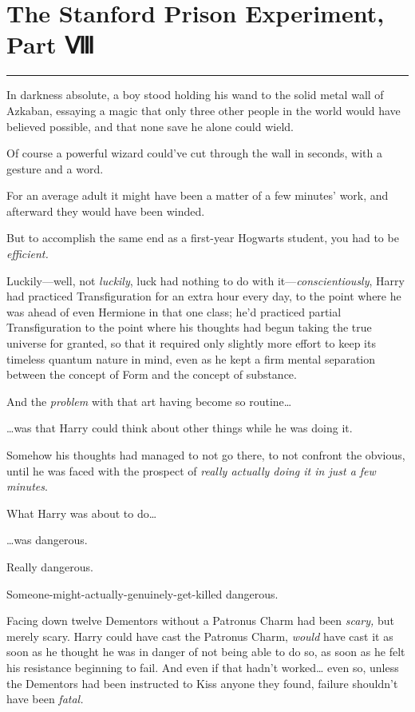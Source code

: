 \chapter{The Stanford Prison Experiment, Part
Ⅷ}\label{the-stanford-prison-experiment-part}

\begin{center}\rule{3in}{0.4pt}\end{center}

In darkness absolute, a boy stood holding his wand to the solid metal
wall of Azkaban, essaying a magic that only three other people in the
world would have believed possible, and that none save he alone could
wield.

Of course a powerful wizard could've cut through the wall in seconds,
with a gesture and a word.

For an average adult it might have been a matter of a few minutes' work,
and afterward they would have been winded.

But to accomplish the same end as a first-year Hogwarts student, you had
to be \emph{efficient.}

Luckily---well, not \emph{luckily}, luck had nothing to do with
it---\emph{conscientiously}, Harry had practiced Transfiguration for an
extra hour every day, to the point where he was ahead of even Hermione
in that one class; he'd practiced partial Transfiguration to the point
where his thoughts had begun taking the true universe for granted, so
that it required only slightly more effort to keep its timeless quantum
nature in mind, even as he kept a firm mental separation between the
concept of Form and the concept of substance.

And the \emph{problem} with that art having become so routine\ldots{}

\ldots{}was that Harry could think about other things while he was doing
it.

Somehow his thoughts had managed to not go there, to not confront the
obvious, until he was faced with the prospect of \emph{really actually
doing it in just a few minutes}.

What Harry was about to do\ldots{}

\ldots{}was dangerous.

Really dangerous.

Someone-might-actually-genuinely-get-killed dangerous.

Facing down twelve Dementors without a Patronus Charm had been
\emph{scary,} but merely scary. Harry could have cast the Patronus
Charm, \emph{would} have cast it as soon as he thought he was in danger
of not being able to do so, as soon as he felt his resistance beginning
to fail. And even if that hadn't worked\ldots{} even so, unless the
Dementors had been instructed to Kiss anyone they found, failure
shouldn't have been \emph{fatal.}

